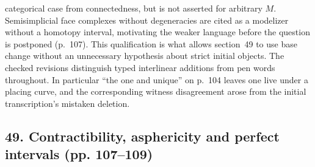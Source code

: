 \documentclass[10pt,oneside]{book}
\begin{document}
categorical case from connectedness, but is not asserted for arbitrary $M$. Semisimplicial face complexes without degeneracies are cited as a modelizer without a homotopy interval, motivating the weaker language before the question is postponed (p.~107). This qualification is what allows section~49 to use base change without an unnecessary hypothesis about strict initial objects. The checked revisions distinguish typed interlinear additions from pen words throughout. In particular ``the one and unique'' on p.~104 leaves one live under a placing curve, and the corresponding witness disagreement arose from the initial transcription's mistaken deletion.

\subsection*{49. Contractibility, asphericity and perfect intervals (pp. 107--109)}
\end{document}
